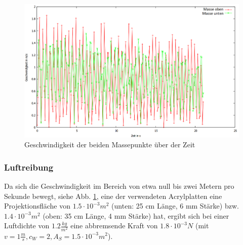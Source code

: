 \begin{figure}
        \includegraphics[width=.9\textwidth]{images/v_ueber_t_neu.png}
\caption{Geschwindigkeit der beiden Massepunkte über der Zeit}
\label{v_ueber_t}
\end{figure}


\subsubsection{Luftreibung}
Da sich die Geschwindigkeit im Bereich von etwa null bis zwei Metern pro Sekunde bewegt, siehe Abb. \ref{v_ueber_t}, eine der verwendeten Acrylplatten eine Projektionsfläche von $ 1.5 \cdot 10^{-3} m^2$ (unten: 25 cm Länge, 6 mm Stärke) bzw. $ 1.4 \cdot 10^{-3} m^2$ (oben: 35 cm Länge, 4 mm Stärke) hat, ergibt sich bei einer Luftdichte von $ 1.2 \frac{kg}{m^2} $ eine abbremsende Kraft von $ 1.8 \cdot 10^{-3} N $ (mit $ v = 1 \frac{m}{s}, c_W = 2, A_S = 1.5 \cdot 10^{-3} m^2 $). 


